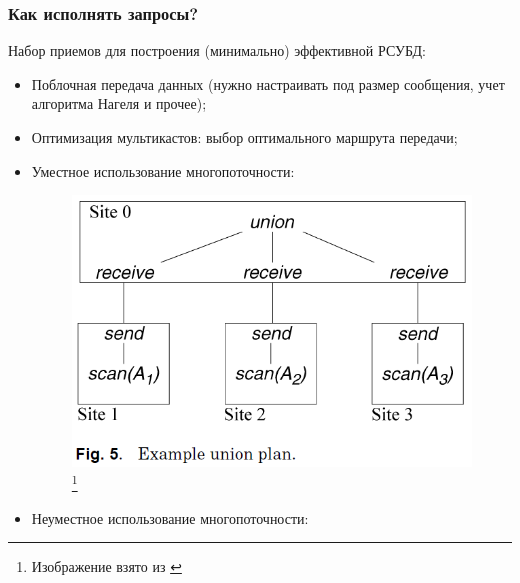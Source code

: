 \documentclass{beamer}
\begin{document}
\begin{frame}[allowframebreaks]
\frametitle{Как исполнять запросы?}

Набор приемов для построения (минимально) эффективной РСУБД: 
\begin{itemize}
  \setlength\itemsep{1em}
  \item Поблочная передача данных (нужно настраивать под размер сообщения, учет алгоритма Нагеля и прочее);
  \item Оптимизация мультикастов: выбор оптимального маршрута передачи;
  \item Уместное использование многопоточности:

  \begin{figure}[htb]
\includegraphics[width=\textwidth,height=0.35\textheight,keepaspectratio]{kossman-4.png} 
\footnote{\tiny{Изображение взято из \cite{Kossmann2000}}}
\end{figure}  
\end{itemize}


\begin{itemize}
  \setlength\itemsep{1em}

  \item \alert{Неуместное} использование многопоточности:


\end{itemize}
\end{frame}
\end{document}
